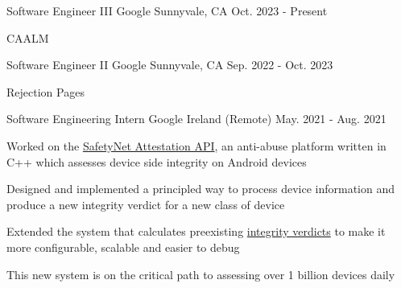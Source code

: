 
\hypersetup{
    colorlinks=true,
    linkcolor=blue,
    filecolor=magenta,
    urlcolor=awesome,
}



\begin{cventries}

  \cventry
    {Software Engineer III}
    {Google}
    {Sunnyvale, CA}
    {Oct. 2023 - Present}
    {
      \begin{cvitems}
        \item CAALM
      \end{cvitems}
    }

  \cventry
    {Software Engineer II}
    {Google}
    {Sunnyvale, CA}
    {Sep. 2022 - Oct. 2023}
    {
      \begin{cvitems}
        \item Rejection Pages
      \end{cvitems}
    }

  \cventry
    {Software Engineering Intern}
    {Google}
    {Ireland (Remote)}
    {May. 2021 - Aug. 2021}
    {
      \begin{cvitems}
      \item Worked on the \href{https://developer.android.com/training/safetynet/attestation}{SafetyNet Attestation API}, an anti-abuse platform written in C++ which assesses device side integrity on Android devices
        \item Designed and implemented a principled way to process device information and produce a new integrity verdict for a new class of device
        \item Extended the system that calculates preexisting \href{https://developer.android.com/training/safetynet/attestation\#potential-integrity-verdicts}{integrity verdicts} to make it more configurable, scalable and easier to debug
        \item This new system is on the critical path to assessing over 1 billion devices daily
      \end{cvitems}
    }


\end{cventries}
